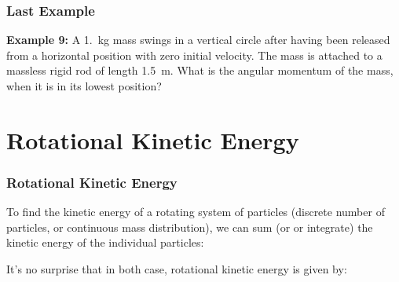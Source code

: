 \documentclass[12pt,compress,aspectratio=169]{beamer}
\newcommand{\eq}[2]{\vspace{#1}{\Large\begin{displaymath}#2\end{displaymath}}}
\begin{document}
\begin{frame}
  \frametitle{Last Example}
  \textbf{Example 9:} A \SI{1.}{\kg} mass swings in a vertical circle after
  having been released from a horizontal position with zero initial velocity.
  The mass is attached to a massless rigid rod of length \SI{1.5}{\metre}. What
  is the angular momentum of the mass, when it is in its lowest position?
\end{frame}


\section{Rotational Kinetic Energy}

\begin{frame}
  \frametitle{Rotational Kinetic Energy}
  To find the kinetic energy of a rotating system of particles (discrete number
  of particles, or continuous mass distribution), we can sum (or or integrate)
  the kinetic energy of the individual particles:
    
  
  \vspace{-.1in}It's no surprise that in both case, rotational kinetic energy
  is given by:
  
  \eq{-.2in}{
    \boxed{K=\frac{1}{2}I\omega^2}
  }
\end{frame}
\end{document}
